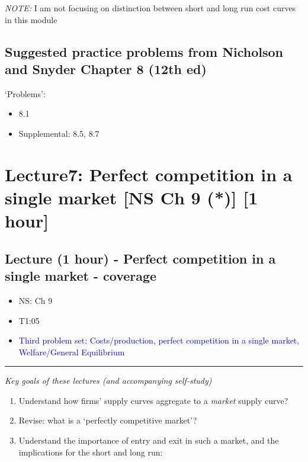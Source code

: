 \documentclass[]{article}
\providecommand{\tightlist}{%
  \setlength{\itemsep}{0pt}\setlength{\parskip}{0pt}}
\begin{document}
\emph{NOTE:} I am not focusing on distinction between short and long run cost curves in this module

\hypertarget{suggested-practice-problems-from-nicholson-and-snyder-chapter-8-12th-ed}{%
\subsection{Suggested practice problems from Nicholson and Snyder Chapter 8 (12th ed)}\label{suggested-practice-problems-from-nicholson-and-snyder-chapter-8-12th-ed}}

`Problems':

\begin{itemize}
\tightlist
\item
  8.1
\item
  Supplemental: 8.5, 8.7
\end{itemize}

\hypertarget{lecture7-perfect-competition-in-a-single-market-ns-ch-9-1-hour}{%
\section{Lecture7: Perfect competition in a single market {[}NS Ch 9 (*){]} {[}1 hour{]}}\label{lecture7-perfect-competition-in-a-single-market-ns-ch-9-1-hour}}

\hypertarget{lecture-1-hour---perfect-competition-in-a-single-market---coverage}{%
\subsection{Lecture (1 hour) - Perfect competition in a single market - coverage}\label{lecture-1-hour---perfect-competition-in-a-single-market---coverage}}

\begin{itemize}
\item
  NS: Ch 9
\item
  T1:05
\item
  \textcolor{blue}{Third problem set: Costs/production, perfect competition in a single market, Welfare/General Equilibrium }
\end{itemize}

\begin{center}\rule{0.5\linewidth}{\linethickness}\end{center}

\emph{Key goals of these lectures (and accompanying self-study)}

\begin{enumerate}
\def\labelenumi{\arabic{enumi}.}
\tightlist
\item
  Understand how firms' supply curves aggregate to a \emph{market} supply curve?
\item
  Revise: what is a `perfectly competitive market'?
\item
  Understand the importance of entry and exit in such a market, and the implications for the short and long run:
\end{enumerate}
\end{document}
